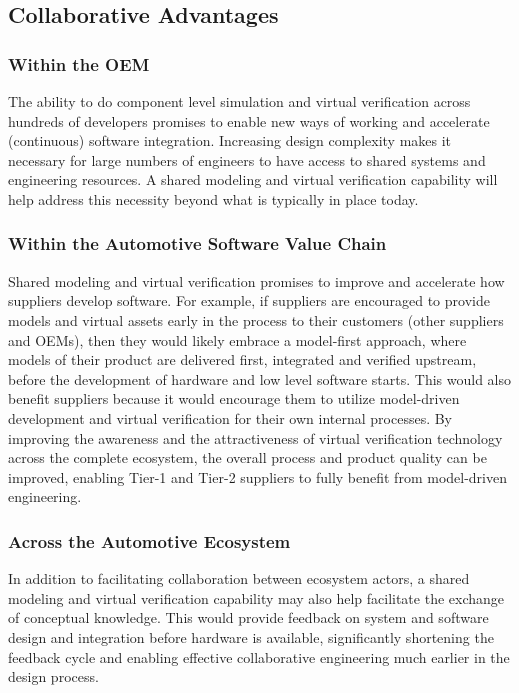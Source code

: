 \subsection{Collaborative Advantages}

\subsubsection{Within the OEM}
The ability to do component level simulation and virtual verification across hundreds of developers promises to enable new ways of working and accelerate (continuous) software integration.
Increasing design complexity makes it necessary for large numbers of engineers to have access to shared systems and engineering resources. A shared modeling and virtual verification capability will help address this necessity beyond what is typically in place today.

\subsubsection{Within the Automotive Software Value Chain}
Shared modeling and virtual verification promises to improve and accelerate how suppliers develop software.
For example, if suppliers are encouraged to provide models and virtual assets early in the process to their customers (other suppliers and OEMs),
then they would likely embrace a model-first approach,
where models of their product are delivered first, integrated and verified upstream, before the development of hardware and low level software starts.
This would also benefit suppliers because it would encourage them to utilize model-driven development and virtual verification for their own internal processes.
By improving the awareness and the attractiveness of virtual verification technology across the complete ecosystem, the overall process and product quality can be improved, enabling Tier-1 and Tier-2 suppliers to fully benefit from model-driven engineering.

\subsubsection{Across the Automotive Ecosystem}
In addition to facilitating collaboration between ecosystem actors, a shared modeling and virtual verification capability may also help facilitate the exchange of conceptual knowledge. This would provide feedback on system and software design and integration before hardware is available, significantly shortening the feedback cycle and enabling effective collaborative engineering much earlier in the design process.

